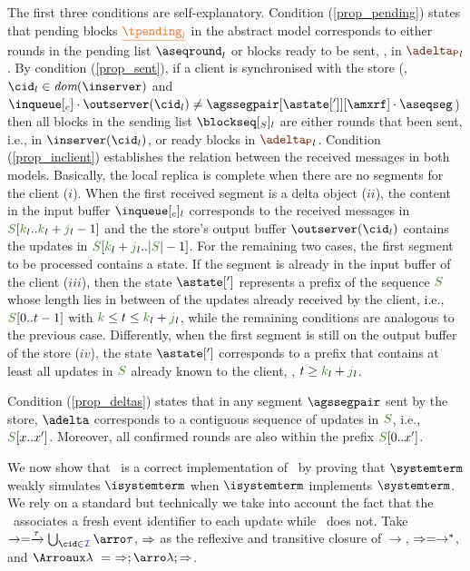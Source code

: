 The  first three conditions are self-explanatory. Condition (\ref{prop_pending})  states that  pending blocks $\flatten{\tpending_l}$ in the abstract model 
corresponds  to either rounds in the  pending list  $\pending_l$ or  blocks ready to 
be sent, \ie, in ${\pushbuffer}_l$.
By condition (\ref{prop_sent}), if a client is synchronised with the store 
(\ie, $\cid_l \in \dom\inserver$ and $\inclient \cdot\outserver(\cid_l) \neq \agssegpair[{\astate[']}][{\amxrf}]\cdot\aseqseg$) 
then  all  blocks  in  the sending list $\tsent_l$  are either rounds 
that been sent, i.e., in $\inserver(\cid_l)$, or ready blocks in ${\pushbuffer}_l$.
Condition (\ref{prop_inclient}) establishes the relation between the received messages in both models. Basically, 
the local replica 
is complete  when there are no segments for the client ($i$).%
When the first received segment is a delta object ($ii$),
 the  content in the input buffer $\inclient_l$ corresponds to the received messages in $\queuemessage[\tknown_l..\tknown_l+\treceivebuffer_l-1]$
and the the store's output buffer $\outserver(\cid_l)$ contains the  updates in $\queuemessage[\tknown_l+\treceivebuffer_l..|\queuemessage| - 1]$. 
For the remaining two  cases, the first segment to be processed contains a state. If the segment is already 
in the input buffer of the client ($iii$), then
the state $\astate[']$ represents a prefix of the sequence $\queuemessage$ 
whose length lies in between of the updates already received by the client, i.e., 
$\queuemessage[0 .. t - 1]$ with  $\tknown\leq t \leq \tknown_l+\treceivebuffer_l$, while the remaining
conditions are analogous to the previous case.  Differently, when the 
first segment is still on the output buffer of the store ($iv$), the state $\astate[']$  corresponds to a
 prefix that contains at least all  updates in $\queuemessage$ already known to the client, 
 \ie, $t \geq \tknown_l+\treceivebuffer_l $.    
 
 Condition (\ref{prop_deltas}) states that in  any segment $\agssegpair$  sent by the 
 store, $\adelta$ corresponds to a contiguous sequence of updates in $\queuemessage$, i.e., $\queuemessage[x..x']$. 
 Moreover, all confirmed rounds are also within the prefix $\queuemessage[0..x']$.


We  now show that \igsp\ is a correct implementation of \gsp\ by proving that 
%
%
$\systemterm$ weakly simulates $\isystemterm$ 
when
 $\isystemterm$  implements $\systemterm$.
 We rely on a standard %
 but technically we take into account the fact that
the \gsp\ associates a fresh event identifier to each update while \igsp\ does not. Take  $\rightarrow = \tr{\tau} \bigcup_{\cid\in\idset} \arroi{\tau}$,
 $\Rightarrow$ as the reflexive and transitive closure of $\rightarrow$, \ie $\Rightarrow = \rightarrow^*$, and 
 $\Arroi{\lambda} \ = \ \Arro;\arroi{\lambda};\Arro$.
 
